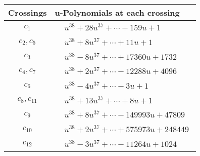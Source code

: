 \documentclass[1p]{elsarticle_modified}
\theoremstyle{definition}
\begin{document}
\begin{tabular}{m{50pt}|m{274pt}}
Crossings & \hspace{64pt}u-Polynomials at each crossing \\
\hline $$\begin{aligned}c_{1}\end{aligned}$$&$\begin{aligned}
&u^{38}+28 u^{37}+\cdots+159 u+1
\end{aligned}$\\
\hline $$\begin{aligned}c_{2},c_{5}\end{aligned}$$&$\begin{aligned}
&u^{38}+8 u^{37}+\cdots+11 u+1
\end{aligned}$\\
\hline $$\begin{aligned}c_{3}\end{aligned}$$&$\begin{aligned}
&u^{38}-8 u^{37}+\cdots+17360 u+1732
\end{aligned}$\\
\hline $$\begin{aligned}c_{4},c_{7}\end{aligned}$$&$\begin{aligned}
&u^{38}+2 u^{37}+\cdots-12288 u+4096
\end{aligned}$\\
\hline $$\begin{aligned}c_{6}\end{aligned}$$&$\begin{aligned}
&u^{38}-4 u^{37}+\cdots-3 u+1
\end{aligned}$\\
\hline $$\begin{aligned}c_{8},c_{11}\end{aligned}$$&$\begin{aligned}
&u^{38}+13 u^{37}+\cdots+8 u+1
\end{aligned}$\\
\hline $$\begin{aligned}c_{9}\end{aligned}$$&$\begin{aligned}
&u^{38}+8 u^{37}+\cdots-149993 u+47809
\end{aligned}$\\
\hline $$\begin{aligned}c_{10}\end{aligned}$$&$\begin{aligned}
&u^{38}+2 u^{37}+\cdots+575973 u+248449
\end{aligned}$\\
\hline $$\begin{aligned}c_{12}\end{aligned}$$&$\begin{aligned}
&u^{38}-3 u^{37}+\cdots-11264 u+1024
\end{aligned}$\\
\hline
\end{tabular}\\~\\
\end{document}
